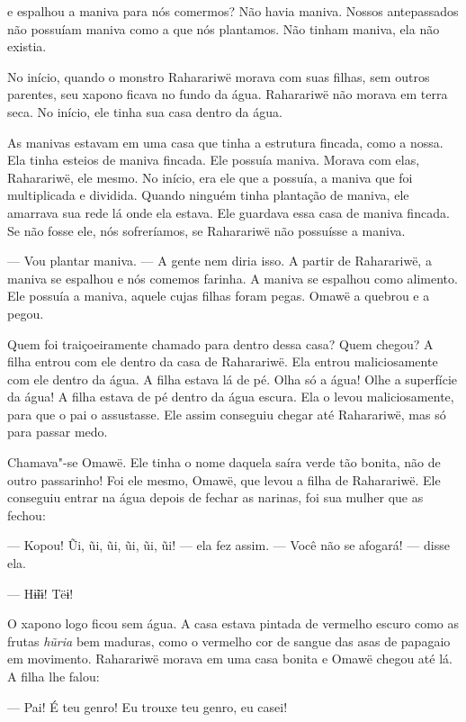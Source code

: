  

 e espalhou a maniva para nós comermos? Não havia maniva.
Nossos antepassados não possuíam maniva como a que nós plantamos. Não
tinham maniva, ela não existia. 

No início, quando o monstro Raharariwë morava com suas filhas, sem outros
parentes, seu xapono ficava no fundo da água. Raharariwë não morava em
terra seca. No início, ele tinha sua casa dentro da água. 

As manivas estavam em uma casa que tinha a estrutura fincada, como a
nossa. Ela tinha esteios de maniva fincada. Ele possuía maniva. Morava
com elas, Raharariwë, ele mesmo. No início, era ele que a possuía, a
maniva que foi multiplicada e dividida. Quando ninguém tinha plantação
de maniva, ele amarrava sua rede lá onde ela estava. Ele guardava essa casa
de maniva fincada. Se não fosse ele, nós sofreríamos, se Raharariwë não
possuísse a maniva. 

--- Vou plantar maniva. --- A gente nem diria isso. A partir de
Raharariwë, a maniva se espalhou e nós comemos farinha. A maniva se
espalhou como alimento. Ele possuía a maniva, aquele cujas filhas foram
pegas. Omawë a quebrou e a pegou.

Quem foi traiçoeiramente chamado para dentro dessa casa? Quem chegou? A
filha entrou com ele dentro da casa de Raharariwë. Ela
entrou maliciosamente com ele dentro da água. A filha estava lá de pé.
Olha só a água! Olhe a superfície da água! A filha estava de pé dentro
da água escura. Ela o levou maliciosamente, para que o pai o assustasse.
Ele assim conseguiu chegar até Raharariwë, mas só para passar medo. 

Chamava"-se Omawë. Ele tinha o nome daquela saíra verde tão bonita, não
de outro passarinho! Foi ele mesmo, Omawë, que levou a filha de
Raharariwë. Ele conseguiu entrar na água depois de fechar as narinas,
foi sua mulher que as fechou:

--- Kopou! Ũi, ũi, ũi, ũi, ũi, ũi! --- ela fez assim. --- Você não se
afogará! --- disse ela. 

--- Hɨ̃ɨɨ! Tëɨ! 

O xapono logo ficou sem água. A casa estava pintada de vermelho escuro como
as frutas \emph{hũria} bem maduras, como o vermelho cor de sangue das
asas de papagaio em movimento. Raharariwë morava em uma casa bonita e
Omawë chegou até lá. A filha lhe falou:

--- Pai! É teu genro! Eu trouxe teu genro, eu casei! 

